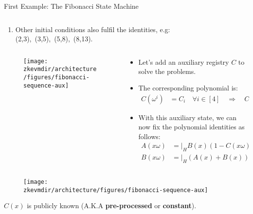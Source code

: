 \begin{frame}[allowframebreaks]{First Example: The Fibonacci State Machine}
\begin{columns}
\begin{column}{0.7\textwidth}
\begin{itemize}
\begin{enumerate}
The equations are not cyclic.
\item Other initial conditions also fulfil the identities, e.g:
(2,3),~(3,5),~(5,8),~(8,13).
\end{enumerate}
\end{itemize}
\end{column}
\end{columns}



\begin{columns}
\begin{column}{0.4\textwidth}
\begin{figure}
	\texttt{[image: \\zkevmdir/architecture/figures/fibonacci-sequence-aux]}
\end{figure}
\end{column}
\begin{column}{0.6\textwidth}
\begin{itemize}
\item Let's add an auxiliary registry $C$ to solve the problems.
\item The corresponding polynomial is:
\begin{align*}
C(\omega^i) &= C_i \quad \forall i \in [4] \quad \Longrightarrow \quad C = [1, 0, 0, 0].
\end{align*}
\item With this auxiliary state, we can now fix the polynomial identities as follows:
\begin{align*}
A(x\omega) &= \bigg\lvert_H  B(x)(1 - C(x\omega)), \\
B(x\omega) &= \bigg\lvert_H (A(x) + B(x))(1 - C(x\omega)) + C(x\omega).
\end{align*}
\end{itemize}
\end{column}
\end{columns}


\begin{columns}
\begin{column}{0.4\textwidth}
\begin{figure}
\texttt{[image: \\zkevmdir/architecture/figures/fibonacci-sequence-aux]}
\end{figure}
$C(x)$ is publicly known (A.K.A \textbf{pre-processed} or \textbf{constant}).
\end{column}


\end{columns}
\end{frame}
